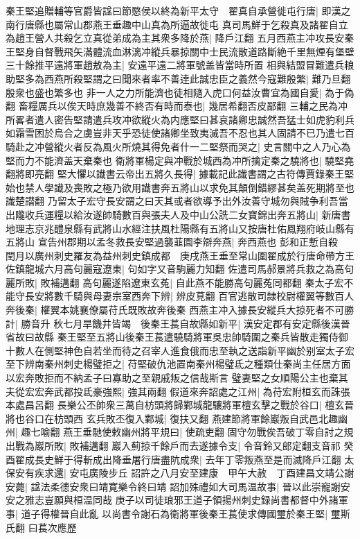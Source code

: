 秦王堅追贈輔等官爵皆諡曰節愍侯以終為新平太守　翟真自承營徙屯行唐|{
	即漢之南行唐縣也屬常山郡燕王垂趣中山真為所逼故徙屯}
真司馬鮮于乞殺真及諸翟自立為趙王營人共殺乞立真從弟成為主其衆多降於燕|{
	降戶江翻}
五月西燕主冲攻長安秦王堅身自督戰飛矢滿體流血淋漓冲縱兵暴掠關中士民流散道路斷絶千里無煙有堡壁三十餘推平遠將軍趙敖為主|{
	安遠平遠二將軍號盖皆當時所置}
相與結盟冒難遣兵粮助堅多為西燕所殺堅謂之曰聞來者率不善逹此誠忠臣之義然今寇難殷繁|{
	難乃旦翻殷衆也盛也繁多也}
非一人之力所能濟也徒相隨入虎口何益汝曹宜為國自愛|{
	為于偽翻}
畜糧厲兵以俟天時庶幾善不終否有時而泰也|{
	幾居希翻否皮鄙翻}
三輔之民為冲所畧者遣人密告堅請遣兵攻冲欲縱火為内應堅曰甚哀諸卿忠誠然吾猛士如虎豹利兵如霜雪困於烏合之虜豈非天乎恐徒使諸卿坐致夷滅吾不忍也其人固請不已乃遣七百騎赴之冲營縱火者反為風火所燒其得免者什一二堅祭而哭之|{
	史言關中之人乃心為堅而力不能濟盖天棄秦也}
衛將軍楊定與冲戰於城西為冲所擒定秦之驍將也|{
	驍堅堯翻將即亮翻}
堅大懼以䜟書云帝出五將久長得|{
	據載記此䜟書謂之古符傳賈錄秦王堅始也禁人學䜟及喪敗之極乃欲用䜟書奔五將山以求免其顛倒錯繆甚矣盖死期將至也䜟楚譛翻}
乃留太子宏守長安謂之曰天其或者欲導予出外汝善守城勿與賊争利吾當出隴收兵運糧以給汝遂帥騎數百與張夫人及中山公詵二女寶錦出奔五將山|{
	新唐書地理志京兆醴泉縣有武將山水經注扶風杜陽縣有五將山又按唐杜佑鳳翔府岐山縣有五將山}
宣告州郡期以孟冬救長安堅過襲韮園李辯奔燕|{
	奔西燕也}
彭和正慙自殺　閏月以廣州刺史羅友為益州刺史鎮成都　庚戌燕王垂至常山圍翟成於行唐命帶方王佐鎮龍城六月高句麗寇遼東|{
	句如字又音駒麗力知翻}
佐遣司馬郝景將兵救之為高句麗所敗|{
	敗補邁翻}
高句麗遂陷遼東玄菟|{
	自此燕不能勝高句麗菟同都翻}
秦太子宏不能守長安將數千騎與母妻宗室西奔下辨|{
	辨皮莧翻}
百官逃散司隸校尉權翼等數百人奔後秦|{
	權翼本姚襄僚屬苻氏既敗故奔後秦}
西燕主冲入據長安縱兵大掠死者不可勝計|{
	勝音升}
秋七月旱饑井皆竭　後秦王萇自故縣如新平|{
	漢安定郡有安定縣後漢晉省故曰故縣}
秦王堅至五將山後秦王萇遣驍騎將軍吳忠帥騎圍之秦兵皆散走獨侍御十數人在側堅神色自若坐而待之召宰人進食俄而忠至執之送詣新平幽於别室太子宏至下辨南秦州刺史楊璧拒之|{
	苻堅破仇池置南秦州楊璧氐之種類仕秦尚主任居方面以宏奔敗拒而不納孟子曰寡助之至親戚叛之信哉斯言}
璧妻堅之女順陽公主也棄其夫從宏宏奔武都投氐豪強熙|{
	強其兩翻}
假道來奔詔處之江州|{
	為苻宏附桓玄而誅張本處昌呂翻}
長樂公丕帥衆三萬自枋頭將歸鄴城龍驤將軍檀玄擊之戰於谷口|{
	檀玄晉將也谷口在枋頭西}
玄兵敗丕復入鄴城|{
	復扶又翻}
燕建節將軍餘巖叛自武邑北趣幽州|{
	趣七喻翻}
燕王垂馳使敕幽州將平規曰|{
	使疏吏翻}
固守勿戰俟吾破丁零自討之規出戰為巖所敗|{
	敗補邁翻}
巖入薊掠千餘戶而去遂據令支|{
	令音鈴又郎定翻支音祁}
癸酉翟成長史鮮于得斬成出降垂屠行唐盡阬成衆|{
	去年丁零叛燕至是而滅降戶江翻}
太保安有疾求還|{
	安屯廣陵步丘}
詔許之八月安至建康　甲午大赦　丁酉建昌文靖公謝安薨|{
	諡法柔德安衆曰靖寛樂令終曰靖}
詔加殊禮如大司馬温故事|{
	晉以此崇寵謝安安之雅志豈願與桓温同哉}
庚子以司徒琅邪王道子領揚州刺史録尚書都督中外諸軍事|{
	道子得權晉自此亂}
以尚書令謝石為衛將軍後秦王萇使求傳國璽於秦王堅|{
	璽斯氏翻}
曰萇次應歷

